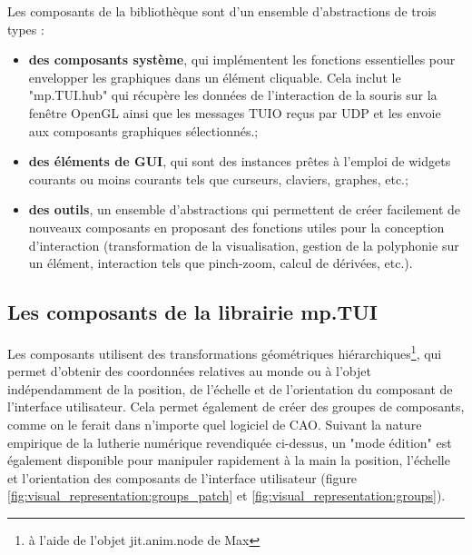Les composants de la bibliothèque sont d'un ensemble d'abstractions de trois types :
\vspace{-1em}
\begin{itemize}[noitemsep]
	\item \textbf{des composants système}, qui implémentent les fonctions essentielles pour envelopper les graphiques dans un élément cliquable. Cela inclut le "mp.TUI.hub" qui récupère les données de l'interaction de la souris sur la fenêtre OpenGL ainsi que les messages TUIO reçus par UDP et les envoie aux composants graphiques sélectionnés.;
	\item \textbf{des éléments de GUI}, qui sont des instances prêtes à l'emploi de widgets courants ou moins courants tels que curseurs, claviers, graphes, etc.;
	\item \textbf{des outils}, un ensemble d'abstractions qui permettent de créer facilement de nouveaux composants en proposant des fonctions utiles pour la conception d'interaction (transformation de la visualisation, gestion de la polyphonie sur un élément, interaction tels que pinch-zoom, calcul de dérivées, etc.).
\end{itemize}

\subsection{Les composants de la librairie mp.TUI}

Les composants utilisent des transformations géométriques hiérarchiques\footnote{à l'aide de l'objet jit.anim.node de Max}, qui permet d'obtenir des coordonnées relatives au monde ou à l'objet indépendamment de la position, de l'échelle et de l'orientation du composant de l'interface utilisateur. Cela permet également de créer des groupes de composants, comme on le ferait dans n'importe quel logiciel de CAO. Suivant la nature empirique de la lutherie numérique revendiquée ci-dessus, un "mode édition" est également disponible pour manipuler rapidement à la main la position, l'échelle et l'orientation des composants de l'interface utilisateur (figure \ref{fig:visual_representation:groups_patch} et \ref{fig:visual_representation:groups}).


